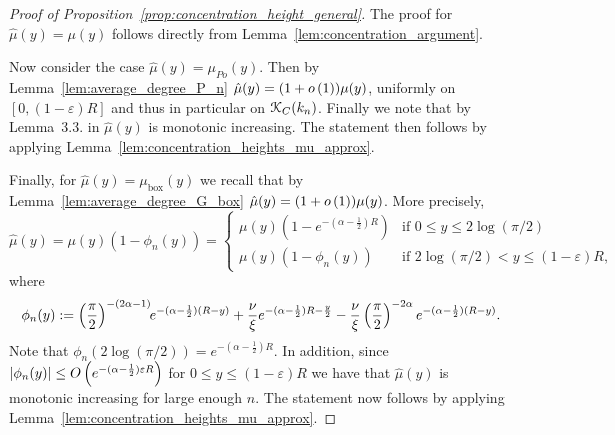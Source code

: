 \begin{appendices}
\begin{proof}[Proof of Proposition~\ref{prop:concentration_height_general}]
The proof for $\hat{\mu}(y) = \mu(y)$ follows directly from Lemma~\ref{lem:concentration_argument}.

Now consider the case $\hat{\mu}(y) = \mu_{Po}(y)$. Then by Lemma~\ref{lem:average_degree_P_n} $\hat{\mu}(y) = (1+o\left(1\right)) \mu(y)$, uniformly on $[0,(1-\varepsilon)R]$ and thus in particular on ${\mathcal K}_C(k_n)$. Finally we note that by Lemma~3.3. in \cite{gugelmann2012random} $\hat{\mu}(y)$ is monotonic increasing. The statement then follows by applying Lemma~\ref{lem:concentration_heights_mu_approx}.

Finally, for $\hat{\mu}(y) = \mu_{\mathrm{box}}(y)$ we recall that by Lemma~\ref{lem:average_degree_G_box} $\hat{\mu}(y) = (1+o\left(1\right))\mu(y)$. More precisely,
\[
	\hat{\mu}(y) = \mu(y)(1-\phi_n(y)) = \begin{cases}
		\mu(y)\left(1 - e^{-(\alpha-\frac{1}{2})R}\right) &\mbox{if } 0 \le y \le 2\log(\pi/2) \\
		\mu(y)\left(1 - \phi_n(y)\right) &\mbox{if } 2\log(\pi/2) < y \le (1-\varepsilon)R,
	\end{cases}
\]
where
\[
	\phi_n(y) :=  \left(\frac{\pi}{2}\right)^{-(2\alpha - 1)} \hspace{-3pt} e^{-(\alpha - \frac{1}{2})(R - y)}
				+ \frac{\nu}{\xi}e^{-(\alpha - \frac{1}{2})R - \frac{y}{2}} - \frac{\nu}{\xi}\left(\frac{\pi}{2}\right)^{-2\alpha} e^{-(\alpha-\frac{1}{2})(R - y)}.
\]
Note that $\phi_n(2\log(\pi/2)) = e^{-(\alpha-\frac{1}{2})R}$. In addition, since $|\phi_n(y)| \le O\left(e^{-(\alpha-\frac{1}{2})\varepsilon R}\right)$ for $0 \le y \le (1-\varepsilon)R$ we have that $\hat{\mu}(y)$ is monotonic increasing for large enough $n$. The statement now follows by applying Lemma~\ref{lem:concentration_heights_mu_approx}.
\end{proof}


\end{appendices}
